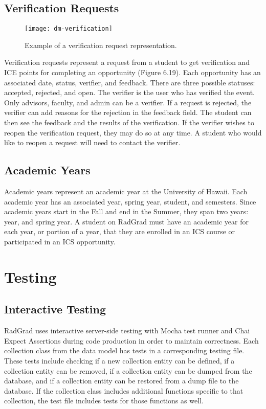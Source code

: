 \subsection{Verification Requests}
\begin{figure}[h]
\centering
\texttt{[image: dm-verification]}
\caption{Example of a verification request representation.}
\end{figure}
Verification requests represent a request from a student to get verification and ICE points for completing an opportunity (Figure 6.19). Each opportunity has an associated date, status, verifier, and feedback. There are three possible statuses: accepted, rejected, and open. The verifier is the user who has verified the event. Only advisors, faculty, and admin can be a verifier. If a request is rejected, the verifier can add reasons for the rejection in the feedback field. The student can then see the feedback and the results of the verification. If the verifier wishes to reopen the verification request, they may do so at any time. A student who would like to reopen a request will need to contact the verifier.  

\subsection{Academic Years}
Academic years represent an academic year at the University of Hawaii. Each academic year has an associated year, spring year, student, and semesters. Since academic years start in the Fall and end in the Summer, they span two years: year, and spring year. A student on RadGrad must have an academic year for each year, or portion of a year, that they are enrolled in an ICS course or participated in an ICS opportunity.

\section{Testing}
\subsection{Interactive Testing}
RadGrad uses interactive server-side testing with Mocha test runner and Chai Expect Assertions during code production in order to maintain correctness. Each collection class from the data model has tests in a corresponding testing file. These tests include checking if a new collection entity can be defined, if a collection entity can be removed, if a collection entity can be dumped from the database, and if a collection entity can be restored from a dump file to the database. If the collection class includes additional functions specific to that collection, the test file includes tests for those functions as well.

